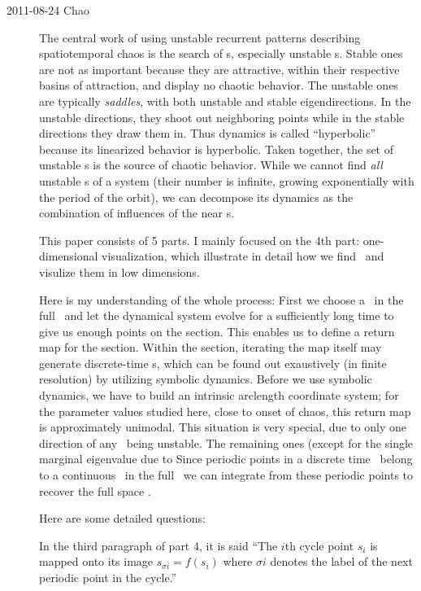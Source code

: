\begin{description}

\item[2011-08-24 Chao]
The central work of using unstable recurrent patterns describing spatiotemporal chaos is the search of \po s, especially unstable \po s. Stable ones are not as important because they are attractive, within their respective basins of attraction,
and display no chaotic behavior. 
The unstable ones are typically \emph{saddles}, with both unstable and stable eigendirections. In the unstable directions, they shoot out neighboring points while in the stable directions 
they draw them in. Thus dynamics is called ``hyperbolic'' because its linearized behavior is hyperbolic. Taken together, the set of unstable \po s is the source of chaotic behavior. 
While we cannot find \emph{all} unstable \po s of a system 
(their number is infinite, growing exponentially
with the period of the orbit), we can decompose its dynamics as the combination of influences of the near \po s.

This paper consists of 5 parts. I mainly focused on the 4th part: one-dimensional visualization, which illustrate in detail how we find \po\  and visulize them in low dimensions.

Here is my understanding of the whole process: First we choose a \PoincSec\
in the full \statesp\ and let the dynamical system evolve for a sufficiently long time to give us enough points on the section. This enables us to define a return map for the section. Within the section, iterating the map itself may generate discrete-time \po s, which can be found out exaustively
(in finite resolution) by utilizing symbolic dynamics. Before we use symbolic dynamics, we have to build an intrinsic arclength coordinate system; for
the parameter values studied here, close to onset of chaos, this return map
is approximately unimodal. This situation is very special, due to only one direction 
of any \po\ being unstable. The remaining ones (except for the single marginal
eigenvalue due to Since periodic points in a discrete time \po\ belong to a continuous \po\  in the full \statesp\, we can integrate from these periodic points to recover the full space \po.

Here are some detailed questions:

In the third paragraph of part 4, it is said 
``The $i$th cycle point  $s_i$ is mapped onto its image $s_{\sigma i} = f(s_i)$ where $\sigma i$ denotes  the label of the next periodic point in the cycle.'' 



\end{description}
